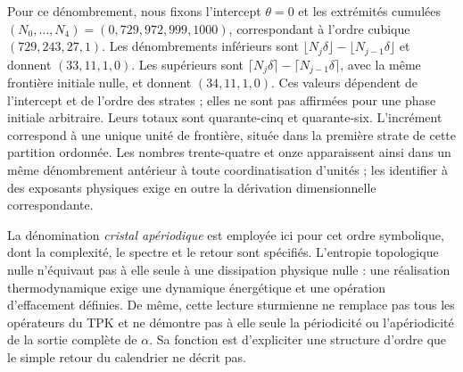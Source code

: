 

Pour ce dénombrement, nous fixons l'intercept \(\theta=0\) et les extrémités cumulées \((N_0,\ldots,N_4)=(0,729,972,999,1000)\), correspondant à l'ordre cubique \((729,243,27,1)\). Les dénombrements inférieurs sont \(\lfloor N_j\delta\rfloor-\lfloor N_{j-1}\delta\rfloor\) et donnent \((33,11,1,0)\). Les supérieurs sont \(\lceil N_j\delta\rceil-\lceil N_{j-1}\delta\rceil\), avec la même frontière initiale nulle, et donnent \((34,11,1,0)\). Ces valeurs dépendent de l'intercept et de l'ordre des strates ; elles ne sont pas affirmées pour une phase initiale arbitraire. Leurs totaux sont quarante-cinq et quarante-six. L'incrément correspond à une unique unité de frontière, située dans la première strate de cette partition ordonnée. Les nombres trente-quatre et onze apparaissent ainsi dans un même dénombrement antérieur à toute coordinatisation d'unités ; les identifier à des exposants physiques exige en outre la dérivation dimensionnelle correspondante.

La dénomination \emph{cristal apériodique} est employée ici pour cet ordre symbolique, dont la complexité, le spectre et le retour sont spécifiés. L'entropie topologique nulle n'équivaut pas à elle seule à une dissipation physique nulle : une réalisation thermodynamique exige une dynamique énergétique et une opération d'effacement définies. De même, cette lecture sturmienne ne remplace pas tous les opérateurs du TPK et ne démontre pas à elle seule la périodicité ou l'apériodicité de la sortie complète de \(\alpha\). Sa fonction est d'expliciter une structure d'ordre que le simple retour du calendrier ne décrit pas.







